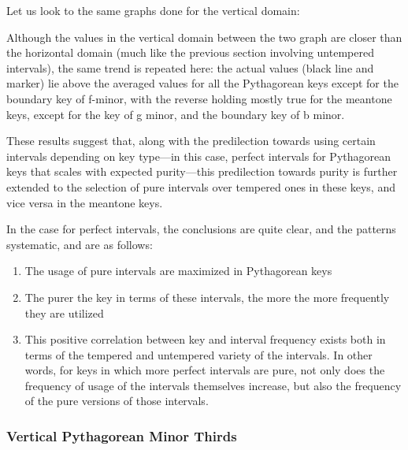 Let us look to the same graphs done for the vertical domain:


    \begin{center}
    \end{center}
    


    \begin{center}
    \end{center}
    
    Although the values in the vertical domain between the two graph are
closer than the horizontal domain (much like the previous section
involving untempered intervals), the same trend is repeated here: the
actual values (black line and marker) lie above the averaged values for
all the Pythagorean keys except for the boundary key of f-minor, with
the reverse holding mostly true for the meantone keys, except for the
key of g minor, and the boundary key of b minor.

These results suggest that, along with the predilection towards using
certain intervals depending on key type---in this case, perfect
intervals for Pythagorean keys that scales with expected
purity---this predilection towards purity is further extended to the
selection of pure intervals over tempered ones in these keys, and vice
versa in the meantone keys.

In the case for perfect intervals, the conclusions are quite clear, and
the patterns systematic, and are as follows:

\begin{enumerate}
\def\labelenumi{\arabic{enumi}.}
\tightlist
\item
  The usage of pure intervals are maximized in Pythagorean keys
\item
  The purer the key in terms of these intervals, the more the more
  frequently they are utilized
\item
  This positive correlation between key and interval frequency exists
  both in terms of the tempered and untempered variety of the intervals.
  In other words, for keys in which more perfect intervals are pure, not
  only does the frequency of usage of the intervals themselves increase,
  but also the frequency of the pure versions of those intervals.
\end{enumerate}

    \subsubsection{Vertical Pythagorean Minor
Thirds}\label{vertical-pythagorean-minor-thirds}

